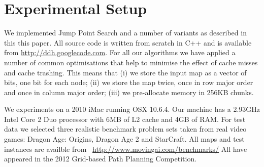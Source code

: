 \section{Experimental Setup}
\label{sec::setup}
We implemented Jump Point Search and a number of variants as described
in this this paper. All source code is written from scratch in C++ and is 
available from \url{http://ddh.googlecode.com}.
For all our algorithms we have applied a number of common optimisations 
that help to minimise the effect of cache misses and cache trashing. 
This means that (i) we store the input map as a vector of bits, one bit 
for each node; (ii) we store the map twice, once in row major order and 
once in column major order; (iii) we pre-allocate memory in 256KB chunks.

We experiments on a 2010 iMac running OSX 10.6.4. Our machine has 
a 2.93GHz Intel Core 2 Duo processor with 6MB of L2 cache and 4GB of RAM.
For test data we selected three realistic benchmark problem sets taken from
real video games: Dragon Age: Origins, Dragon Age 2 and StarCraft.  
All maps and test instances are availble from 
~\url{http://www.movingai.com/benchmarks/}
All have appeared in the 2012 Grid-based Path Planning Competition. 
